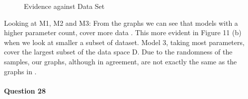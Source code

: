 \documentclass[10pt, a4paper, twocolumn]{article} %
\begin{document}
\begin{enumerate}
 \begin{figure}[H]%
    \centering
    \qquad
    \caption{Evidence against Data Set}%
    \label{fig:example}%
\end{figure}
  
  Looking at M1, M2 and M3:
  From the graphs we can see that models with a higher parameter count, cover more data . This more evident in Figure 11 (b) when we look at smaller a subset of dataset. Model 3, taking most parameters, cover the largest subset of the data space D. Due to the randomness of the samples, our graphs, although in agreement, are not exactly the same as the graphs in \cite{murray2005note}.\\\\
  
  \textbf{Question 28}\\
  

\end{enumerate}
\end{document}

